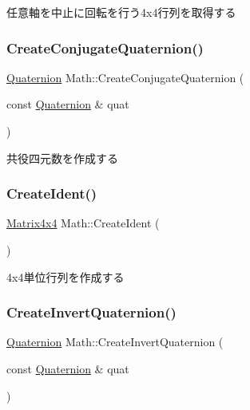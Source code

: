 任意軸を中止に回転を行う4x4行列を取得する 

\mbox{\label{namespace_math_a69178ac4c7a158859b5e693397f07048}} 
\subsubsection{\texorpdfstring{Create\+Conjugate\+Quaternion()}{CreateConjugateQuaternion()}}
{\footnotesize\ttfamily \mbox{\hyperlink{struct_math_1_1_quaternion}{Quaternion}} Math\+::\+Create\+Conjugate\+Quaternion (\begin{DoxyParamCaption}\item[{const \mbox{\hyperlink{struct_math_1_1_quaternion}{Quaternion}} \&}]{quat }\end{DoxyParamCaption})}



共役四元数を作成する 

\mbox{\label{namespace_math_aad7bb8945263031607f8b323d9ae1cd7}} 
\subsubsection{\texorpdfstring{Create\+Ident()}{CreateIdent()}}
{\footnotesize\ttfamily \mbox{\hyperlink{struct_math_1_1_matrix4x4}{Matrix4x4}} Math\+::\+Create\+Ident (\begin{DoxyParamCaption}{ }\end{DoxyParamCaption})}



4x4単位行列を作成する 

\mbox{\label{namespace_math_ae7fbde4f45edfa3a988c966f6184fca9}} 
\subsubsection{\texorpdfstring{Create\+Invert\+Quaternion()}{CreateInvertQuaternion()}}
{\footnotesize\ttfamily \mbox{\hyperlink{struct_math_1_1_quaternion}{Quaternion}} Math\+::\+Create\+Invert\+Quaternion (\begin{DoxyParamCaption}\item[{const \mbox{\hyperlink{struct_math_1_1_quaternion}{Quaternion}} \&}]{quat }\end{DoxyParamCaption})}



